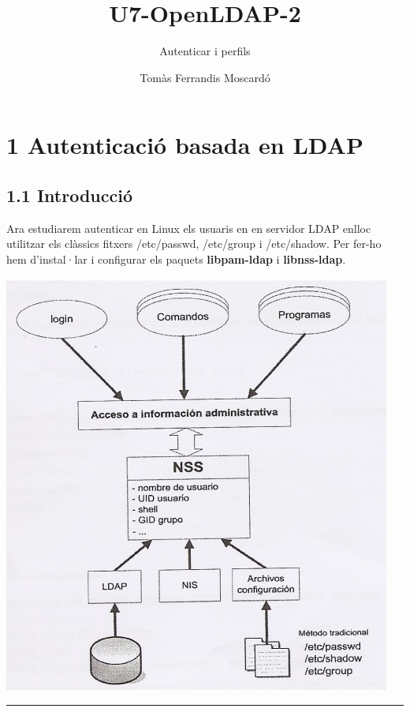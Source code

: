 \documentclass[
  12 pt,
  a4paper,
]{article}
\title{U7-OpenLDAP-2}
\subtitle{Autenticar i perfils}
\author{Tomàs Ferrandis Moscardó}
\date{}
\begin{document}
\maketitle

{
\setcounter{tocdepth}{2}
\tableofcontents
}
\newpage

\section{1 Autenticació basada en
LDAP}\label{autenticaciuxf3-basada-en-ldap}

\subsection{1.1 Introducció}\label{introducciuxf3}

Ara estudiarem autenticar en Linux els usuaris en en servidor LDAP
enlloc utilitzar els clàssics fitxers /etc/passwd, /etc/group i
/etc/shadow. Per fer-ho hem d'instal·lar i configurar els paquets
\textbf{libpam-ldap} i \textbf{libnss-ldap}.

\includegraphics{png/nss.png}

\begin{center}\rule{0.5\linewidth}{0.5pt}\end{center}
\end{document}
